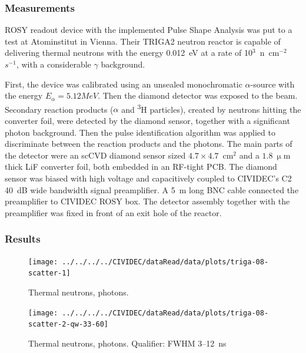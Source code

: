 \documentclass[12pt]{packages/mytustyle}  %
\begin{document}
\subsubsection{Measurements}
ROSY readout device with the implemented Pulse Shape Analysis was put to a test at Atominstitut in Vienna. Their TRIGA2 neutron reactor is capable of delivering thermal neutrons with the energy 0.012~eV at a rate of 10$^3$~n~cm$^{-2}$ $s^{-1}$, with a considerable $\gamma$ background. 

First, the device was calibrated using an unsealed monochromatic $\alpha$-source with the energy $E_\alpha=5.12MeV$. Then the diamond detector was exposed to the beam. Secondary reaction products ($\alpha$ and \textsuperscript{3}H particles), created by neutrons hitting the converter foil, were detected by the diamond sensor, together with a significant photon background. Then the pulse identification algorithm was applied to discriminate between the reaction products and the photons.
The main parts of the detector were an scCVD diamond sensor sized $4.7\times4.7$~cm$^2$ and a $1.8~\upmu$m thick LiF converter foil, both embedded in an RF-tight PCB. The diamond sensor was biased with high voltage and capacitively coupled to CIVIDEC's C2 40~dB wide bandwidth signal preamplifier. A 5~m long BNC cable connected the preamplifier to CIVIDEC ROSY box. The detector assembly together with the preamplifier was fixed in front of an exit hole of the reactor.

\subsubsection{Results}

\begin{figure}[!t]
\centering
\texttt{[image: ../../../../CIVIDEC/dataRead/data/plots/triga-08-scatter-1]}
\caption{Thermal neutrons, photons.}
\label{fig:scattertriga1}
\end{figure}


\clearpage
\begin{figure}[!t]
\centering
\texttt{[image: ../../../../CIVIDEC/dataRead/data/plots/triga-08-scatter-2-qw-33-60]}
\caption{Thermal neutrons, photons. Qualifier: FWHM 3--12~ns}
\label{fig:scattertriga1}
\end{figure}
\end{document}

